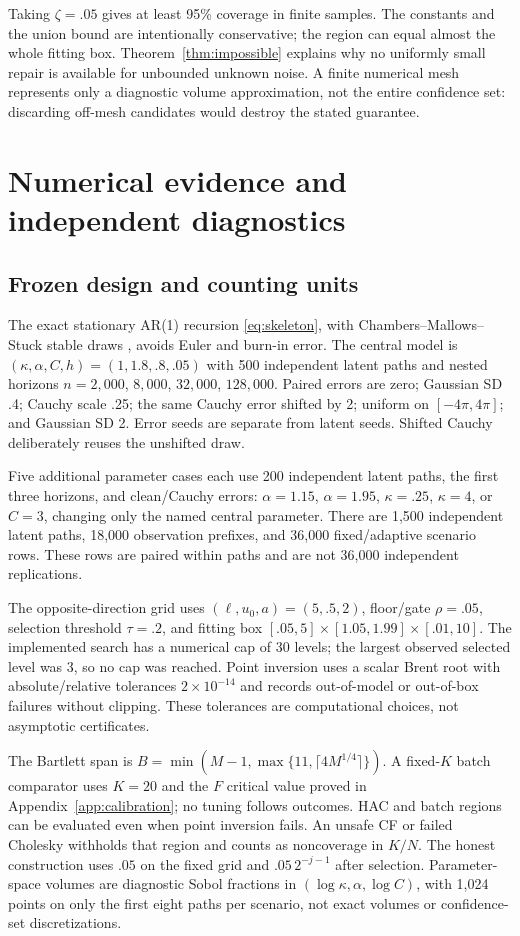 \documentclass[11pt,a4paper]{article}
\theoremstyle{remark}\newtheorem{remark}[theorem]{Remark}
\begin{document}
Taking $\zeta=.05$ gives at least 95\% coverage in finite samples. The constants and the union bound are intentionally conservative; the region can equal almost the whole fitting box. Theorem~\ref{thm:impossible} explains why no uniformly small repair is available for unbounded unknown noise. A finite numerical mesh represents only a diagnostic volume approximation, not the entire confidence set: discarding off-mesh candidates would destroy the stated guarantee.

\section{Numerical evidence and independent diagnostics}\label{sec:numerics}
\subsection{Frozen design and counting units}
The exact stationary AR(1) recursion \eqref{eq:skeleton}, with Chambers--Mallows--Stuck stable draws \cite{cms}, avoids Euler and burn-in error. The central model is $(\kappa,\alpha,C,h)=(1,1.8,.8,.05)$ with 500 independent latent paths and nested horizons $n=2{,}000$, $8{,}000$, $32{,}000$, $128{,}000$. Paired errors are zero; Gaussian SD .4; Cauchy scale .25; the same Cauchy error shifted by 2; uniform on $[-4\pi,4\pi]$; and Gaussian SD 2. Error seeds are separate from latent seeds. Shifted Cauchy deliberately reuses the unshifted draw.

Five additional parameter cases each use 200 independent latent paths, the first three horizons, and clean/Cauchy errors: $\alpha=1.15$, $\alpha=1.95$, $\kappa=.25$, $\kappa=4$, or $C=3$, changing only the named central parameter. There are 1,500 independent latent paths, 18,000 observation prefixes, and 36,000 fixed/adaptive scenario rows. These rows are paired within paths and are not 36,000 independent replications.

The opposite-direction grid uses $(\ell,u_0,a)=(5,.5,2)$, floor/gate $\rho=.05$, selection threshold $\tau=.2$, and fitting box $[.05,5]\times[1.05,1.99]\times[.01,10]$. The implemented search has a numerical cap of 30 levels; the largest observed selected level was 3, so no cap was reached. Point inversion uses a scalar Brent root with absolute/relative tolerances $2\times10^{-14}$ and records out-of-model or out-of-box failures without clipping. These tolerances are computational choices, not asymptotic certificates.

The Bartlett span is $B=\min(M-1,\max\{11,\lceil4M^{1/4}\rceil\})$. A fixed-$K$ batch comparator uses $K=20$ and the $F$ critical value proved in Appendix~\ref{app:calibration}; no tuning follows outcomes. HAC and batch regions can be evaluated even when point inversion fails. An unsafe CF or failed Cholesky withholds that region and counts as noncoverage in $K/N$. The honest construction uses $.05$ on the fixed grid and $.05\,2^{-j-1}$ after selection. Parameter-space volumes are diagnostic Sobol fractions in $(\log\kappa,\alpha,\log C)$, with 1,024 points on only the first eight paths per scenario, not exact volumes or confidence-set discretizations.
\end{document}
